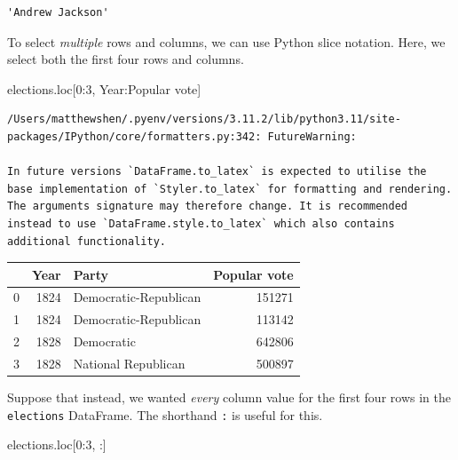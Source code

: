 \documentclass[
  letterpaper,
  DIV=11,
  numbers=noendperiod]{scrreprt}
\newenvironment{Shaded}{\begin{snugshade}}{\end{snugshade}}
\newcommand{\DecValTok}[1]{\textcolor[rgb]{0.68,0.00,0.00}{#1}}
\newcommand{\NormalTok}[1]{\textcolor[rgb]{0.00,0.23,0.31}{#1}}
\newcommand{\StringTok}[1]{\textcolor[rgb]{0.13,0.47,0.30}{#1}}
\begin{document}
\begin{verbatim}
'Andrew Jackson'
\end{verbatim}

To select \emph{multiple} rows and columns, we can use Python slice
notation. Here, we select both the first four rows and columns.

\begin{Shaded}
\begin{Highlighting}[]
\NormalTok{elections.loc[}\DecValTok{0}\NormalTok{:}\DecValTok{3}\NormalTok{, }\StringTok{\textquotesingle{}Year\textquotesingle{}}\NormalTok{:}\StringTok{\textquotesingle{}Popular vote\textquotesingle{}}\NormalTok{]}
\end{Highlighting}
\end{Shaded}

\begin{verbatim}
/Users/matthewshen/.pyenv/versions/3.11.2/lib/python3.11/site-packages/IPython/core/formatters.py:342: FutureWarning:

In future versions `DataFrame.to_latex` is expected to utilise the base implementation of `Styler.to_latex` for formatting and rendering. The arguments signature may therefore change. It is recommended instead to use `DataFrame.style.to_latex` which also contains additional functionality.
\end{verbatim}

\begin{tabular}{lrlr}
\toprule
{} &  Year &                  Party &  Popular vote \\
\midrule
0 &  1824 &  Democratic-Republican &        151271 \\
1 &  1824 &  Democratic-Republican &        113142 \\
2 &  1828 &             Democratic &        642806 \\
3 &  1828 &    National Republican &        500897 \\
\bottomrule
\end{tabular}

Suppose that instead, we wanted \emph{every} column value for the first
four rows in the \texttt{elections} DataFrame. The shorthand \texttt{:}
is useful for this.

\begin{Shaded}
\begin{Highlighting}[]
\NormalTok{elections.loc[}\DecValTok{0}\NormalTok{:}\DecValTok{3}\NormalTok{, :]}
\end{Highlighting}
\end{Shaded}
\end{document}
